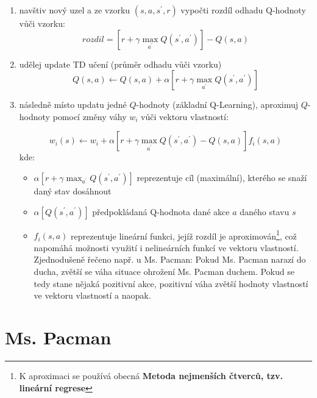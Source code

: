 \begin{enumerate}

\item navštiv nový uzel a ze vzorku $(s,a,s^\prime,r)$ vypočti rozdíl odhadu Q-hodnoty vůči vzorku:
\begin{displaymath}
 rozdil = \left [ r + \gamma \max_{a^\prime}Q(s^\prime,a^\prime) \right]  - Q(s,a) 
\end{displaymath}
\item udělej update TD učení (průměr odhadu vůči vzorku)
\begin{displaymath}
 Q(s,a) \leftarrow  Q(s,a) + \alpha \left [ r + \gamma \max_{a^\prime}Q(s^\prime,a^\prime) \right]
\end{displaymath}
\item následně místo updatu jedné $Q$-hodnoty (základní Q-Learning), aproximuj $Q$-hodnoty pomocí změny váhy $w_i$ vůči vektoru vlastností:

\begin{displaymath}
w_i(s) \leftarrow w_i + \alpha \left [ r + \gamma \max_{a^\prime}Q(s^\prime,a^\prime) - Q(s,a) \right] f_i(s,a)
\end{displaymath}
kde:
\begin{itemize}
	\item $\alpha \left [ r + \gamma \max_{a^\prime}Q(s^\prime,a^\prime)\right] $ reprezentuje cíl (maximální), kterého se snaží daný stav dosáhnout
	\item $\alpha \left [ Q(s^\prime,a^\prime)\right]$ předpokládaná Q-hodnota dané akce $a$ daného stavu $s$
	\item $f_i(s,a)$ reprezentuje lineární funkci, jejíž rozdíl je aproximován\footnote{K aproximaci se používá obecná \textbf{Metoda nejmenších čtverců, tzv. lineární regrese}}, což napomáhá možnosti využití i nelineárních funkcí ve vektoru vlastností. \newline
	Zjednodušeně řečeno např. u Ms. Pacman: Pokud Ms. Pacman narazí do ducha, zvětší se váha situace ohrožení Ms. Pacman duchem. Pokud se tedy stane nějaká pozitivní akce, pozitivní váha zvětší hodnoty vlastností ve vektoru vlastností a naopak.
\end{itemize}

\end{enumerate}

\chapter{Ms. Pacman}
